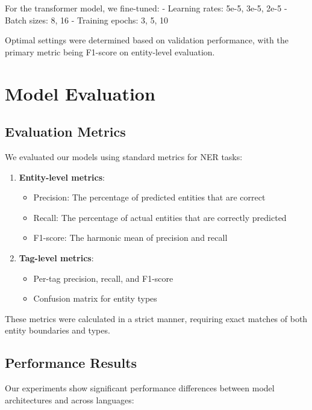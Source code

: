 \documentclass[
]{article}
\providecommand{\tightlist}{%
  \setlength{\itemsep}{0pt}\setlength{\parskip}{0pt}}\usepackage{longtable,booktabs,array}
\begin{document}
For the transformer model, we fine-tuned: - Learning rates: 5e-5, 3e-5,
2e-5 - Batch sizes: 8, 16 - Training epochs: 3, 5, 10

Optimal settings were determined based on validation performance, with
the primary metric being F1-score on entity-level evaluation.

\section{Model Evaluation}\label{model-evaluation}

\subsection{Evaluation Metrics}\label{evaluation-metrics}

We evaluated our models using standard metrics for NER tasks:

\begin{enumerate}
\def\labelenumi{\arabic{enumi}.}
\tightlist
\item
  \textbf{Entity-level metrics}:

  \begin{itemize}
  \tightlist
  \item
    Precision: The percentage of predicted entities that are correct
  \item
    Recall: The percentage of actual entities that are correctly
    predicted
  \item
    F1-score: The harmonic mean of precision and recall
  \end{itemize}
\item
  \textbf{Tag-level metrics}:

  \begin{itemize}
  \tightlist
  \item
    Per-tag precision, recall, and F1-score
  \item
    Confusion matrix for entity types
  \end{itemize}
\end{enumerate}

These metrics were calculated in a strict manner, requiring exact
matches of both entity boundaries and types.

\subsection{Performance Results}\label{performance-results}

Our experiments show significant performance differences between model
architectures and across languages:
\end{document}
